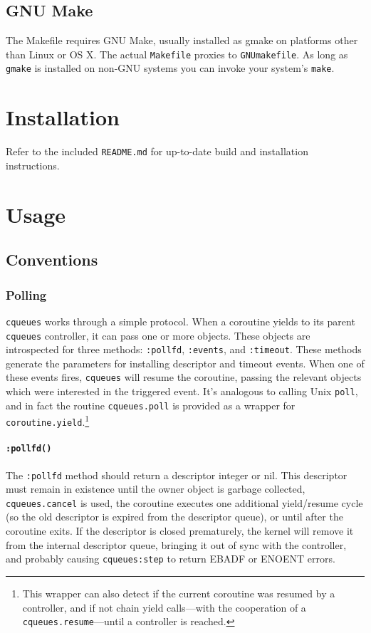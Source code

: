 \documentclass[11pt, oneside]{memoir}
\newcommand*{\cqueues}[0]{\texttt{cqueues}\xspace}
\newcommand*{\syscall}[1]{\texttt{#1}\xspace}
\newcommand*{\routine}[1]{\texttt{#1}\xspace}
\newcommand*{\method}[1]{\texttt{#1}\xspace}
\begin{document}
\section{GNU Make}

The Makefile requires GNU Make, usually installed as gmake on platforms other than Linux or OS X. The actual \texttt{Makefile} proxies to \texttt{GNUmakefile}. As long as \texttt{gmake} is installed on non-GNU systems you can invoke your system's \texttt{make}.

\chapter{Installation}

Refer to the included \texttt{README.md} for up-to-date build and installation instructions.

\chapter{Usage}

\section{Conventions}

\subsection{Polling}

\cqueues works through a simple protocol. When a coroutine yields to its parent \cqueues controller, it can pass one or more objects. These objects are introspected for three methods: \method{:pollfd}, \method{:events}, and \method{:timeout}. These methods generate the parameters for installing descriptor and timeout events. When one of these events fires, \cqueues will resume the coroutine, passing the relevant objects which were interested in the triggered event. It's analogous to calling Unix \syscall{poll}, and in fact the routine \routine{cqueues.poll} is provided as a wrapper for \routine{coroutine.yield}.\footnote{This wrapper can also detect if the current coroutine was resumed by a controller, and if not chain yield calls---with the cooperation of a \routine{cqueues.resume}---until a controller is reached.}

\subsubsection[\method{object:pollfd}]{\method{:pollfd()}} The \method{:pollfd} method should return a descriptor integer or nil. This descriptor must remain in existence until the owner object is garbage collected, \routine{cqueues.cancel} is used, the coroutine executes one additional yield/resume cycle (so the old descriptor is expired from the descriptor queue), or until after the coroutine exits. If the descriptor is closed prematurely, the kernel will remove it from the internal descriptor queue, bringing it out of sync with the controller, and probably causing \method{cqueues:step} to return EBADF or ENOENT errors.
\end{document}
